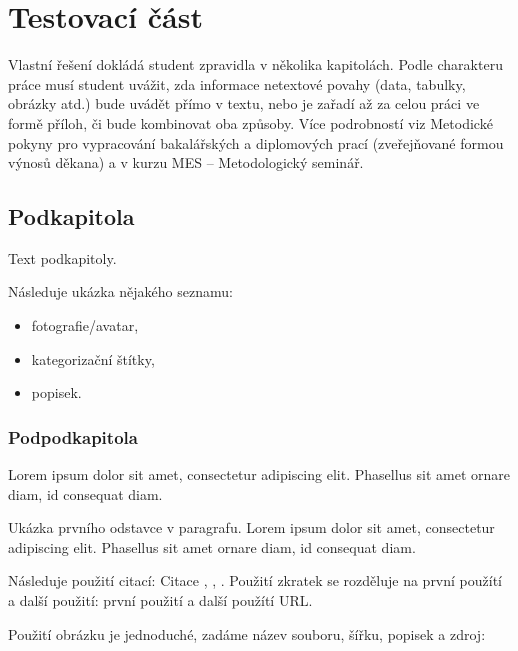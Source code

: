 \section{Testovací část}


Vlastní řešení dokládá student zpravidla v několika kapitolách. Podle charakteru práce musí student uvážit, zda informace
netextové povahy (data, tabulky, obrázky atd.) bude uvádět přímo v textu, nebo je zařadí až za celou práci ve formě příloh, či bude kombinovat oba způsoby.
Více podrobností viz Metodické pokyny pro vypracování bakalářských a diplomových prací (zveřejňované formou výnosů děkana)
a v kurzu MES – Metodologický seminář.

	\subsection{Podkapitola}

	Text podkapitoly.

	Následuje ukázka nějakého seznamu:
	\begin{itemize}
		\item fotografie/avatar,
		\item kategorizační štítky,
		\item popisek.
	\end{itemize}

		\subsubsection{Podpodkapitola}

		Lorem ipsum dolor sit amet, consectetur adipiscing elit. Phasellus sit amet ornare diam, id consequat diam.


			\noindent Ukázka prvního odstavce v paragrafu. Lorem ipsum dolor sit amet, consectetur adipiscing elit. Phasellus sit amet ornare diam, id consequat diam.

			Následuje použití citací: Citace \cite{html_hypertext_markup_language}, \cite{hibernate_docs}, \cite{ddd_quickly}.
			Použití zkratek se rozděluje na první použítí a další použití: první použití  a další použítí \ac{URL}.

			Použití obrázku je jednoduché, zadáme název souboru, šířku, popisek a zdroj:


